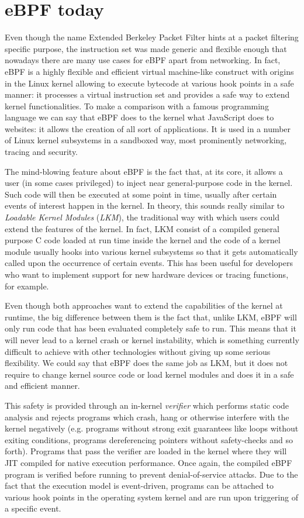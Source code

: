 \section{eBPF today}

Even though the name Extended Berkeley Packet Filter hints at a packet filtering specific purpose, the instruction set was made generic and flexible enough that nowadays there are many use cases for eBPF apart from networking. 
In fact, eBPF is a highly flexible and efficient virtual machine-like construct with origins in the Linux kernel allowing to execute bytecode at various hook points in a safe manner: it processes a virtual instruction set and provides a safe way to extend kernel functionalities.
To make a comparison with a famous programming language we can say that eBPF does to the kernel what JavaScript does to websites: it allows the creation of all sort of applications.
It is used in a number of Linux kernel subsystems in a sandboxed way, most prominently networking, tracing and security.

The mind-blowing feature about eBPF is the fact that, at its core, it allows a user (in some cases privileged) to inject near general-purpose code in the kernel. 
Such code will then be executed at some point in time, usually after certain events of interest happen in the kernel. 
In theory, this sounds really similar to \textit{Loadable Kernel Modules} (\textit{LKM}), the traditional way with which users could extend the features of the kernel.
In fact, LKM consist of a compiled general purpose C code loaded at run time inside the kernel and the code of a kernel module usually hooks into various kernel subsystems so that it gets automatically called upon the occurrence of certain events.
This has been useful for developers who want to implement support for new hardware devices or tracing functions, for example.

Even though both approaches want to extend the capabilities of the kernel at runtime, the big difference between them is the fact that, unlike LKM, eBPF will only run code that has been evaluated completely safe to run.
This means that it will never lead to a kernel crash or kernel instability, which is something currently difficult to achieve with other technologies without giving up some serious flexibility. 
We could say that eBPF does the same job as LKM, but it does not require to change kernel source code or load kernel modules and does it in a safe and efficient manner.

This safety is provided through an in-kernel \textit{verifier} which performs static code analysis and rejects programs which crash, hang or otherwise interfere with the kernel negatively (e.g. programs without strong exit guarantees like loops without exiting conditions, programs dereferencing pointers without safety-checks and so forth).
Programs that pass the verifier are loaded in the kernel where they will JIT compiled for native execution performance.
Once again, the compiled eBPF program is verified before running to prevent denial-of-service attacks.
Due to the fact that the execution model is event-driven, programs can be attached to various hook points in the operating system kernel and are run upon triggering of a specific event.

